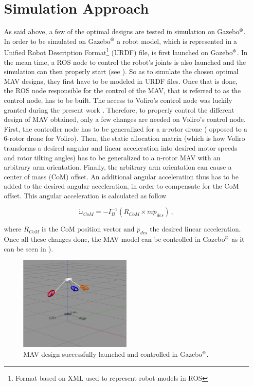 \section{Simulation Approach}
\label{sec:control_approach}
As said above, a few of the optimal designs are tested in simulation on
Gazebo$^\textrm{\textregistered}$. In order to be simulated on
Gazebo$^\textrm{\textregistered}$ a robot model, which is represented
in a Unified Robot Description Format\footnote{Format based on XML used
to represent robot models in ROS} (URDF) file, is first launched on
Gazebo$^\textrm{\textregistered}$. In the mean time, a ROS node to control
the robot’s joints is also launched and the simulation can then properly start
(see ).
So as to simulate the chosen optimal MAV designs, they first have to be
modeled in URDF files. Once that is done, the ROS node responsible for the
control of the MAV, that is referred to as the control node, has to be built.
The access to Voliro’s control node was luckily granted during the present work
 \citep{kamel_voliro:_2018}. Therefore, to properly control the different
design of MAV obtained, only a few changes are needed on Voliro’s control
node. First, the controller node has to be generalized for a n-rotor drone (
opposed to a 6-rotor drone for Voliro). Then, the static allocation matrix
(which is how Voliro transforms a desired angular and linear acceleration into
desired motor speeds and rotor tilting angles)
has to be generalized to a n-rotor MAV with an arbitrary arm orientation.
Finally, the arbitrary arm orientation can cause a center of mass (CoM)
offset. An additional angular acceleration thus has to be added to the desired
angular acceleration, in order to compensate for the CoM offset. This
angular acceleration is calculated as follow

\begin{equation}
  \label{com_offset}
	\dot{\omega}_{CoM} = -I_B^{-1}(R_{CoM}\times m\ddot{p}_{des})\, ,
\end{equation}

where $R_{CoM}$ is the CoM position vector and $\ddot{p}_{des}$ the desired
linear acceleration.\\
Once all these changes done, the MAV model can be controlled in
Gazebo$^\textrm{\textregistered}$ as it can be seen in ).

\begin{figure}[!h]
  \centering
  \includegraphics[width=0.5\textwidth]{images/sim_gazebo.png}
  \caption{MAV design successfully launched and controlled in Gazebo$^\textrm{\textregistered}$.}
  \label{fig:sim_gazebo}
\end{figure}
